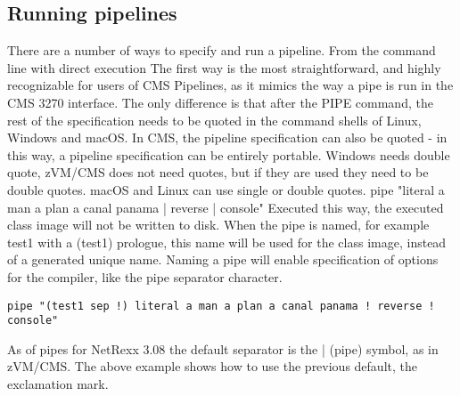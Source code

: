 \subsection{Running pipelines}
There are a number of ways to specify and run a pipeline.
From the command line with direct execution
The first way is the most straightforward, and highly recognizable for users of CMS Pipelines, as it mimics the way a pipe is run in the CMS 3270 interface. The only difference is that after the PIPE command, the rest of the specification needs to be quoted in the command shells of Linux, Windows and macOS. In CMS, the pipeline specification can also be quoted - in this way, a pipeline specification can be entirely portable. Windows needs double quote, zVM/CMS does not need quotes, but if they are used they need to be double quotes. macOS and Linux can use single or double quotes.
pipe "literal a man a plan a canal panama | reverse | console"
Executed this way, the executed class image will not be written to disk. When the pipe is named, for example test1 with a (test1) prologue, this name will be used for the class image, instead of a generated unique name. Naming a pipe will enable specification of options for the compiler, like the pipe separator character.
\begin{verbatim}
pipe "(test1 sep !) literal a man a plan a canal panama ! reverse !
console"
\end{verbatim}
As of pipes for NetRexx 3.08 the default separator is the | (pipe)
symbol, as in zVM/CMS. The above example shows how to use the previous
default, the exclamation mark.

